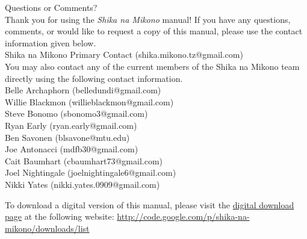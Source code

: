 \begin{center}
{\Huge Questions or Comments?}\\[12pt]
Thank you for using the \textit{Shika na Mikono} manual! If you have any questions, comments, or would like to request a copy of this manual, please use the contact information given below.\\[20pt]
Shika na Mikono Primary Contact (shika.mikono.tz@gmail.com)\\[20pt]
You may also contact any of the current members of the Shika na Mikono team directly using the following contact information.\\[20pt]
Belle Archaphorn (belledundi@gmail.com)\\
Willie Blackmon (willieblackmon@gmail.com)\\
Steve Bonomo (sbonomo3@gmail.com)\\
Ryan Early (ryan.early@gmail.com)\\
Ben Savonen (blsavone@mtu.edu)\\

Joe Antonacci (mdfb30@gmail.com)\\
Cait Baumhart (cbaumhart73@gmail.com)\\
Joel Nightingale (joelnightingale6@gmail.com)\\
Nikki Yates (nikki.yates.0909@gmail.com)\\


\end{center}
\vfill
To download a digital version of this manual, please visit the \href{http://code.google.com/p/shika-na-mikono/downloads/list}{digital download page} at the following website: \url{http://code.google.com/p/shika-na-mikono/downloads/list}